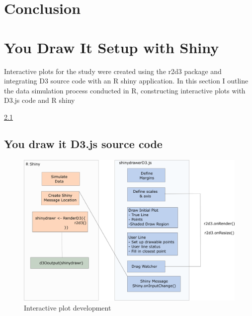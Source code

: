 \documentclass[print]{nuthesis}
\begin{document}
\hypertarget{conclusion}{%
\chapter{Conclusion}\label{conclusion}}

\appendix

\hypertarget{youdrawit-with-shiny}{%
\chapter{You Draw It Setup with Shiny}\label{youdrawit-with-shiny}}

Interactive plots for the study were created using the r2d3 package and integrating D3 source code with an R shiny application.
In this section I outline the data simulation process conducted in R, constructing interactive plots with D3.js code and R shiny

\cref{fig:r2d3-shiny-flowchart}

\hypertarget{d3.js-source-code}{%
\section{You draw it D3.js source code}\label{d3.js-source-code}}

\begin{figure}[tbp]

{\centering \includegraphics[width=0.8\linewidth,]{images/r2d3+shiny-inkscape} 

}

\caption{Interactive plot development}\label{fig:r2d3-shiny-flowchart}
\end{figure}
\end{document}
